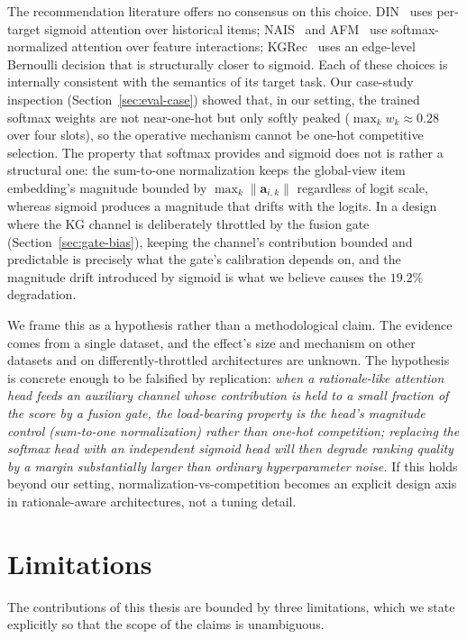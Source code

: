 The recommendation literature offers no consensus on this choice. DIN~\cite{zhou2018din} uses per-target sigmoid attention over historical items; NAIS~\cite{he2018nais} and AFM~\cite{xiao2017afm} use softmax-normalized attention over feature interactions; KGRec~\cite{yang2023kgrec} uses an edge-level Bernoulli decision that is structurally closer to sigmoid. Each of these choices is internally consistent with the semantics of its target task. Our case-study inspection (Section~\ref{sec:eval-case}) showed that, in our setting, the trained softmax weights are not near-one-hot but only softly peaked ($\max_k w_k \approx 0.28$ over four slots), so the operative mechanism cannot be one-hot competitive selection. The property that softmax provides and sigmoid does not is rather a structural one: the sum-to-one normalization keeps the global-view item embedding's magnitude bounded by $\max_k \|\mathbf{a}_{i,k}\|$ regardless of logit scale, whereas sigmoid produces a magnitude that drifts with the logits. In a design where the KG channel is deliberately throttled by the fusion gate (Section~\ref{sec:gate-bias}), keeping the channel's contribution bounded and predictable is precisely what the gate's calibration depends on, and the magnitude drift introduced by sigmoid is what we believe causes the $19.2\%$ degradation.

We frame this as a hypothesis rather than a methodological claim. The evidence comes from a single dataset, and the effect's size and mechanism on other datasets and on differently-throttled architectures are unknown. The hypothesis is concrete enough to be falsified by replication: \emph{when a rationale-like attention head feeds an auxiliary channel whose contribution is held to a small fraction of the score by a fusion gate, the load-bearing property is the head's magnitude control (sum-to-one normalization) rather than one-hot competition; replacing the softmax head with an independent sigmoid head will then degrade ranking quality by a margin substantially larger than ordinary hyperparameter noise.} If this holds beyond our setting, normalization-vs-competition becomes an explicit design axis in rationale-aware architectures, not a tuning detail.

\section{Limitations}
\label{sec:conclude-limits}

The contributions of this thesis are bounded by three limitations, which we state explicitly so that the scope of the claims is unambiguous.

